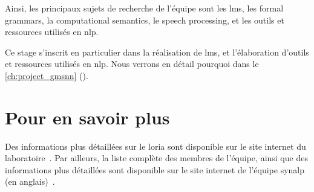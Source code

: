 Ainsi, les principaux sujets de recherche de l'équipe sont les \glspl{lm}, les \gls{formal grammars}, la \gls{computational semantics}, le \gls{speech processing}, et les outils et ressources utilisés en \gls{nlp}.

Ce stage s'inscrit en particulier dans la réalisation de \glspl{lm}, et l'élaboration d'outils et ressources utilisés en \gls{nlp}. Nous verrons en détail pourquoi dans le \autoref{ch:project_gmsnn} ().

\section{Pour en savoir plus}
Des informations plus détaillées sur le \gls{loria} sont disponible sur {le site internet du laboratoire~\autocite{about_loria}}.
Par ailleurs, la liste complète des membres de l'équipe, ainsi que des informations plus détaillées sont disponible sur {le site internet de l'équipe \gls{synalp} (en anglais)~\autocite{about_synalp}}.
